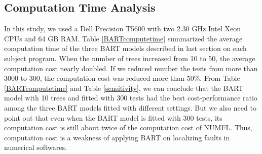 \subsection{Computation Time Analysis}
In this study, we used a Dell Precision T5600 with two 2.30 GHz Intel Xeon CPUs and 64 GB RAM. Table \ref{BARTcomputetime} summarized the average computation time of the three BART models described in last section on each subject program.  When the number of trees increased from 10 to 50, the average computation cost nearly doubled. If we reduced number the tests from more than 3000 to 300, the computation cost was reduced more than 50\%.  From Table \ref{BARTcomputetime} and Table \ref{sensitivity}, we can conclude that the BART model with 10 trees and fitted with 300 tests had the best cost-performance ratio among the three BART models fitted with different settings. But we also need to point out that even when the BART model is fitted with 300 tests, its computation cost is still about twice of the computation cost of NUMFL. Thus, computation cost is a weakness of applying BART on localizing faults in numerical softwares. 

